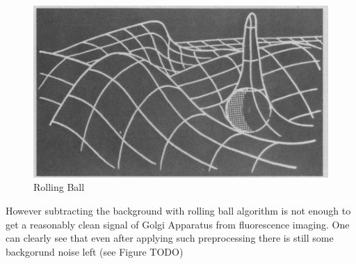 \begin{figure}[htb]
	\begin{center}
		\includegraphics[width=0.5\linewidth]{bilder/rolling-ball.png}
		\caption{Rolling Ball}\label{fig:rolling-ball}
	\end{center}
\end{figure}

However subtracting the background with rolling ball algorithm is not enough to get a reasonably clean signal of Golgi Apparatus from fluorescence imaging. One can clearly see that even after applying such preprocessing there is still some backgorund noise left (see Figure TODO)